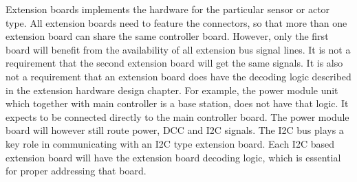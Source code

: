 Extension boards implements the hardware for the particular sensor or actor type. All extension boards need to feature the connectors, so that more than one extension board can share the same controller board. However, only the first board will benefit from the availability of all extension bus signal lines. It is not a requirement that the second extension board will get the same signals. It is also not a requirement that an extension board does have the decoding logic described in the extension hardware design chapter. For example, the power module unit which together with main controller is a base station, does not have that logic. It expects to be connected directly to the main controller board. The power module board will however still route power, DCC and I2C signals. The I2C bus plays a key role in communicating with an I2C type extension board. Each I2C based extension board will have the extension board decoding logic, which is essential for proper addressing that board.